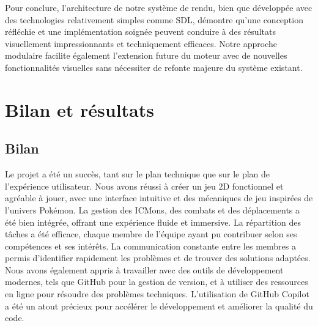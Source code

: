 \documentclass[12pt,a4paper, twoside]{article}
\begin{document}
Pour conclure, l'architecture de notre système de rendu, bien que développée avec des technologies relativement simples comme SDL, démontre qu'une conception réfléchie et une implémentation soignée peuvent conduire à des résultats visuellement impressionnants et techniquement efficaces. Notre approche modulaire facilite également l'extension future du moteur avec de nouvelles fonctionnalités visuelles sans nécessiter de refonte majeure du système existant.
\newpage
\section{Bilan et résultats}

\subsection{Bilan}
Le projet a été un succès, tant sur le plan technique que sur le plan de l'expérience utilisateur. Nous avons réussi à créer un jeu 2D fonctionnel et agréable à jouer, avec une interface intuitive et des mécaniques de jeu inspirées de l'univers Pokémon. La gestion des ICMons, des combats et des déplacements a été bien intégrée, offrant une expérience fluide et immersive.
La répartition des tâches a été efficace, chaque membre de l'équipe ayant pu contribuer selon ses compétences et ses intérêts. La communication constante entre les membres a permis d'identifier rapidement les problèmes et de trouver des solutions adaptées.
Nous avons également appris à travailler avec des outils de développement modernes, tels que GitHub pour la gestion de version, et à utiliser des ressources en ligne pour résoudre des problèmes techniques. L'utilisation de GitHub Copilot a été un atout précieux pour accélérer le développement et améliorer la qualité du code.
\end{document}
